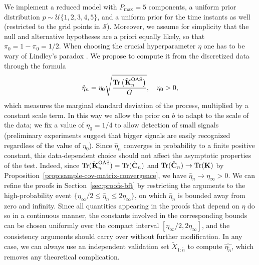 We implement a reduced model with \(P_{\max}=5\) components, a uniform prior distribution \(p\sim\mathcal U\{1,2,3,4,5\}\), and a uniform prior for the time instants as well (restricted to the grid points in \(\mathcal S\)). Moreover, we assume for simplicity that the null and alternative hypotheses are a priori equally likely, so that \(\pi_0=1-\pi_0=1/2\). When choosing the crucial hyperparameter \(\eta\) one has to be wary of Lindley's paradox \citep{lindley1957statistical}. We propose to compute it from the discretized data through the formula
\[
\hat \eta_n=\eta_0 \sqrt{\frac{\tr\big(\hatbfKnOAS\big)}{G}}, \quad \eta_0>0,
\]
which measures the marginal standard deviation of the process, multiplied by a constant scale term. In this way we allow the prior on \(b\) to adapt to the scale of the data; we fix a value of \(\eta_0=1/4\) to allow detection of small signals (preliminary experiments suggest that bigger signals are easily recognized regardless of the value of \(\eta_0\)). Since \(\hat\eta_n\) converges in probability to a finite positive constant, this data-dependent choice should not affect the asymptotic properties of the test. Indeed, since \(\tr(\hatbfKnOAS)=\tr({\hat{\mathbf C}_n})\) and \(\operatorname{Tr}(\hat{\mathbf C}_n) \to \operatorname{Tr}({\mathbf K})\) by Proposition~\ref{prop:sample-cov-matrix-convergence}, we have \(\hat \eta_n \to \eta_\infty > 0\). We can refine the proofs in Section~\ref{sec:proofs-bft} by restricting the arguments to the high-probability event \(\{\eta_\infty/2 \leq \hat\eta_n \leq 2\eta_\infty\}\), on which \(\hat\eta_n\) is bounded away from zero and infinity. Since all quantities appearing in the proofs that depend on \(\eta\) do so in a continuous manner, the constants involved in the corresponding bounds can be chosen uniformly over the compact interval \([\eta_\infty/2, 2\eta_\infty]\), and the consistency arguments should carry over without further modification. In any case, we can always use an independent validation set \(\tilde{X}_{1:\tilde{n}}\) to compute \(\hat{\eta_{\tilde n}}\), which removes any theoretical complication.

